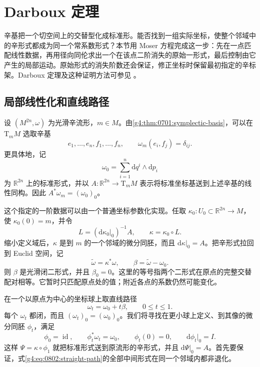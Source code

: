 
% 
% 

\section{Darboux 定理}
\label{g4:sec:0802}

辛基把一个切空间上的交替型化成标准形。能否找到一组实际坐标，使整个邻域中的辛形式都成为同一个常系数形式？本节用 Moser 方程完成这一步：先在一点匹配线性数据，再用径向同伦求出一个在该点二阶消失的原始一形式，最后控制由它产生的局部运动。原始形式的消失阶数还会保证，修正坐标时保留最初指定的辛标架。Darboux 定理及这种证明方法可参见 \cite[第1.4--1.5节，特别是第90--91页的定理1.8、1.9]{Cannas2006Symplectic}。

\subsection{局部线性化和直线路径}
\label{g4:subsec:0802:01}

设 \((M^{2n},\omega)\) 为光滑辛流形，\(m\in M\)。由\cref{g4:thm:0701:symplectic-basis}，可以在 \(\mathrm{T}_mM\) 选取辛基
\[
	e_1,\ldots,e_n,f_1,\ldots,f_n,\qquad
	\omega_m(e_i,f_j)=\delta_{ij}.
\]
更具体地，记
\[
	\omega_0=\sum_{i=1}^n\mathrm{d}q^i\wedge\mathrm{d}p_i
\]
为 \(\mathbb R^{2n}\) 上的标准形式，并以 \(A:\mathbb R^{2n}\to\mathrm{T}_mM\) 表示将标准坐标基送到上述辛基的线性同构。因此 \(A^*\omega_m=(\omega_0)_0\)。

\ProseParagraphBreak

这个指定的一阶数据可以由一个普通坐标参数化实现。任取 \(\kappa_0:U_0\subset\mathbb R^{2n}\to M\)，使 \(\kappa_0(0)=m\)，并令
\[
	L=(\mathrm{d}\kappa_0|_0)^{-1}A,\qquad
	\kappa=\kappa_0\circ L.
\]
缩小定义域后，\(\kappa\) 是到 \(m\) 的一个邻域的微分同胚，而且 \(\mathrm{d}\kappa|_0=A\)。把辛形式拉回到 Euclid 空间，记
\[
	\widetilde\omega=\kappa^*\omega,\qquad
	\beta=\widetilde\omega-\omega_0.
\]
则 \(\beta\) 是光滑闭二形式，并且 \(\beta_0=0\)。这里的等号指两个二形式在原点的完整交替配对相等。它暂时只匹配原点处的值；附近各点的系数仍然可能变化。

\ProseParagraphBreak

在一个以原点为中心的坐标球上取直线路径
\begin{equation}
	\label{g4:eq:0802:straight-path}
	\omega_t=\omega_0+t\beta,\qquad 0\le t\le1.
\end{equation}
每个 \(\omega_t\) 都闭，而且 \((\omega_t)_0=(\omega_0)_0\)。我们将寻找在更小球上定义、到其像的微分同胚 \(\phi_t\)，满足
\[
	\phi_0=\operatorname{id},\qquad
	\phi_t^*\omega_t=\omega_0,\qquad
	\phi_t(0)=0,\qquad \mathrm{d}\phi_t|_0=I.
\]
这样 \(\Psi=\kappa\circ\phi_1\) 就把标准形式送到原流形的辛形式，并且 \(\mathrm{d}\Psi|_0=A\)。首先要保证，式\eqref{g4:eq:0802:straight-path}的全部中间形式在同一个邻域内都非退化。

